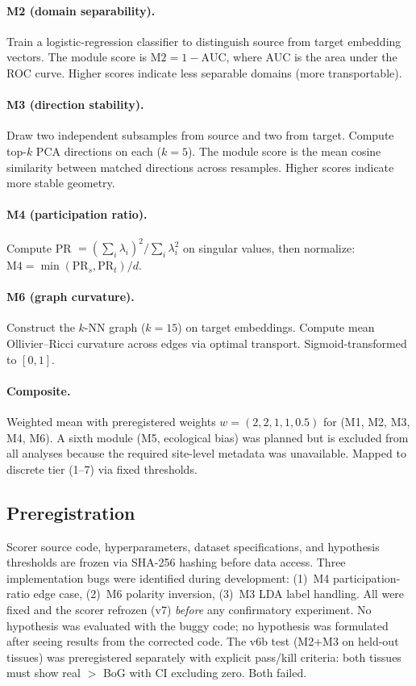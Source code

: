 \documentclass[10pt,letterpaper]{article}
\begin{document}
\paragraph{M2 (domain separability).} Train a logistic-regression classifier to distinguish source from target embedding vectors. The module score is $\text{M2} = 1 - \text{AUC}$, where AUC is the area under the ROC curve. Higher scores indicate less separable domains (more transportable).

\paragraph{M3 (direction stability).} Draw two independent subsamples from source and two from target. Compute top-$k$ PCA directions on each ($k = 5$). The module score is the mean cosine similarity between matched directions across resamples. Higher scores indicate more stable geometry.

\paragraph{M4 (participation ratio).} Compute PR $= (\sum_i \lambda_i)^2 / \sum_i \lambda_i^2$ on singular values, then normalize: $\text{M4} = \min(\text{PR}_s, \text{PR}_t) / d$.

\paragraph{M6 (graph curvature).} Construct the $k$-NN graph ($k = 15$) on target embeddings. Compute mean Ollivier--Ricci curvature across edges via optimal transport. Sigmoid-transformed to $[0, 1]$.

\paragraph{Composite.} Weighted mean with preregistered weights $w = (2, 2, 1, 1, 0.5)$ for (M1, M2, M3, M4, M6). A sixth module (M5, ecological bias) was planned but is excluded from all analyses because the required site-level metadata was unavailable. Mapped to discrete tier (1--7) via fixed thresholds.

\subsection{Preregistration}

Scorer source code, hyperparameters, dataset specifications, and hypothesis thresholds are frozen via SHA-256 hashing before data access. Three implementation bugs were identified during development: (1)~M4 participation-ratio edge case, (2)~M6 polarity inversion, (3)~M3 LDA label handling. All were fixed and the scorer refrozen (v7) \emph{before} any confirmatory experiment. No hypothesis was evaluated with the buggy code; no hypothesis was formulated after seeing results from the corrected code. The v6b test (M2+M3 on held-out tissues) was preregistered separately with explicit pass/kill criteria: both tissues must show real $>$ BoG with CI excluding zero. Both failed.
\end{document}
